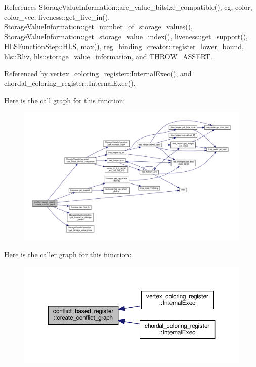 References Storage\+Value\+Information\+::are\+\_\+value\+\_\+bitsize\+\_\+compatible(), cg, color, color\+\_\+vec, liveness\+::get\+\_\+live\+\_\+in(), Storage\+Value\+Information\+::get\+\_\+number\+\_\+of\+\_\+storage\+\_\+values(), Storage\+Value\+Information\+::get\+\_\+storage\+\_\+value\+\_\+index(), liveness\+::get\+\_\+support(), H\+L\+S\+Function\+Step\+::\+H\+LS, max(), reg\+\_\+binding\+\_\+creator\+::register\+\_\+lower\+\_\+bound, hls\+::\+Rliv, hls\+::storage\+\_\+value\+\_\+information, and T\+H\+R\+O\+W\+\_\+\+A\+S\+S\+E\+RT.



Referenced by vertex\+\_\+coloring\+\_\+register\+::\+Internal\+Exec(), and chordal\+\_\+coloring\+\_\+register\+::\+Internal\+Exec().

Here is the call graph for this function\+:
\nopagebreak
\begin{figure}[H]
\begin{center}
\leavevmode
\includegraphics[width=350pt]{da/db2/classconflict__based__register_af30a10c52d9bda402b67284972e9d2a4_cgraph}
\end{center}
\end{figure}
Here is the caller graph for this function\+:
\nopagebreak
\begin{figure}[H]
\begin{center}
\leavevmode
\includegraphics[width=350pt]{da/db2/classconflict__based__register_af30a10c52d9bda402b67284972e9d2a4_icgraph}
\end{center}
\end{figure}


